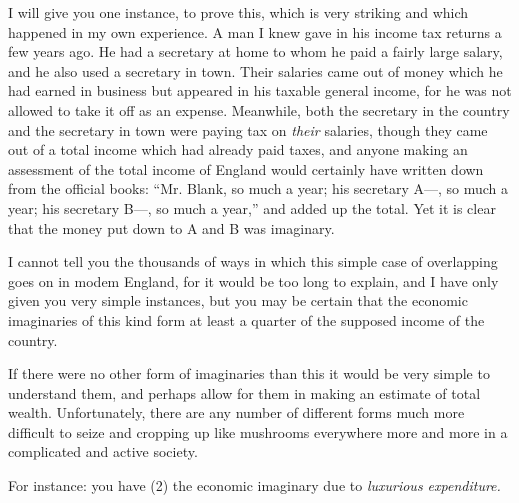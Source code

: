 \documentclass{book}
\begin{document}
I will give you one instance, to prove this, which is very striking and which happened in my own experience. A man I knew gave in his income tax returns a few years ago. He had a secretary at home to whom he paid a fairly large salary, and he also used a secretary in town. Their salaries came out of money which he had earned in business but appeared in his taxable general income, for he was not allowed to take it off as an expense. Meanwhile, both the secretary in the country and the secretary in town were paying tax on \emph{their} salaries, though they came out of a total income which had already paid taxes, and anyone making an assessment of the total income of England would certainly have written down from the official books: “Mr. Blank, so much a year; his secretary A—, so much a year; his secretary B—, so much a year,” and added up the total. Yet it is clear that the money put down to A and B was imaginary.

I cannot tell you the thousands of ways in which this simple case of overlapping goes on in modem England, for it would be too long to explain, and I have only given you very simple instances, but you may be certain that the economic imaginaries of this kind form at least a quarter of the supposed income of the country.

If there were no other form of imaginaries than this it would be very simple to understand them, and perhaps allow for them in making an estimate of total wealth. Unfortunately, there are any number of different forms much more difficult to seize and cropping up like mushrooms everywhere more and more in a complicated and active society.

For instance: you have (2) the economic imaginary due to \emph{luxurious expenditure.}
\end{document}
